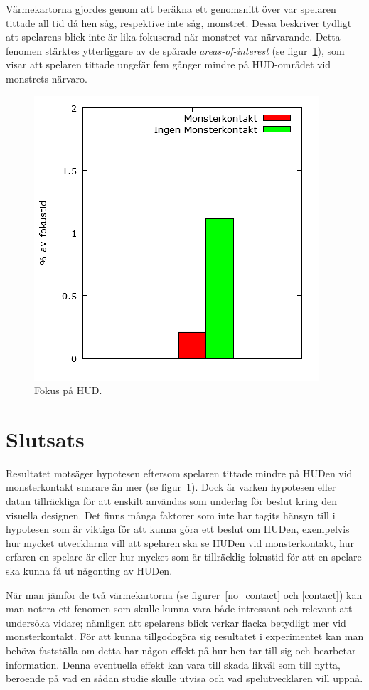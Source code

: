 \documentclass{article}
\begin{document}
\newpage

Värmekartorna gjordes genom att beräkna ett genomsnitt över var spelaren tittade all tid då hen såg, respektive inte såg, monstret. Dessa beskriver tydligt att spelarens blick inte är lika fokuserad när monstret var närvarande. Detta fenomen stärktes ytterliggare av de spårade \textit{areas-of-interest} (se figur~\ref{bars}), som visar att spelaren tittade ungefär fem gånger mindre på HUD-området vid monstrets närvaro.

\begin{figure}[h!]
    \begin{center}
        \includegraphics*[width=0.50\columnwidth]{experiment/bars.png}
        \caption{Fokus på HUD.}
        \label{bars}
    \end{center}
\end{figure}



\section{Slutsats}

Resultatet motsäger hypotesen eftersom spelaren tittade mindre på HUDen vid monsterkontakt snarare än mer (se figur~\ref{bars}). Dock är varken hypotesen eller datan tillräckliga för att enskilt användas som underlag för beslut kring den visuella designen. Det finns många faktorer som inte har tagits hänsyn till i hypotesen som är viktiga för att kunna göra ett beslut om HUDen, exempelvis hur mycket utvecklarna vill att spelaren ska se HUDen vid monsterkontakt, hur erfaren en spelare är eller hur mycket som är tillräcklig fokustid för att en spelare ska kunna få ut någonting av HUDen.

När man jämför de två värmekartorna (se figurer~\ref{no_contact} och \ref{contact}) kan man notera ett fenomen som skulle kunna vara både intressant och relevant att undersöka vidare; nämligen att spelarens blick verkar flacka betydligt mer vid monsterkontakt. För att kunna tillgodogöra sig resultatet i experimentet kan man behöva fastställa om detta har någon effekt på hur hen tar till sig och bearbetar information. Denna eventuella effekt kan vara till skada likväl som till nytta, beroende på vad en sådan studie skulle utvisa och vad spelutvecklaren vill uppnå.
\end{document}
